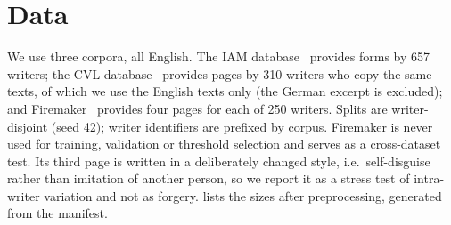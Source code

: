 \section{Data}
\label{sec:data}
We use three corpora, all English.
The IAM database~\cite{marti2002iam} provides forms by 657 writers; the CVL database~\cite{kleber2013cvl} provides pages by 310 writers who copy the same texts, of which we use the English texts only (the German excerpt is excluded); and Firemaker~\cite{bulacu2003firemaker} provides four pages for each of 250 writers.
Splits are writer-disjoint (seed 42); writer identifiers are prefixed by corpus.
Firemaker is never used for training, validation or threshold selection and serves as a cross-dataset test.
Its third page is written in a deliberately changed style, i.e.\ self-disguise rather than imitation of another person, so we report it as a stress test of intra-writer variation and not as forgery.
 lists the sizes after preprocessing, generated from the manifest.

\begin{table}[t]
\caption{Writers and pages after preprocessing. IAM writers with a single page contribute two half-page views to training only; Firemaker is used for testing only.}
\label{tab:data}
\centering\scriptsize
\setlength{\tabcolsep}{3pt}
\resizebox{\columnwidth}{!}{}
\end{table}

